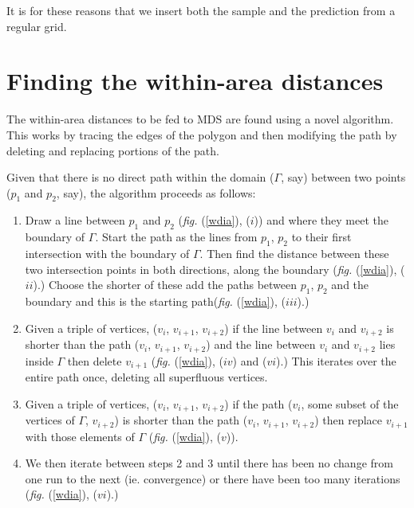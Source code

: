 \documentclass[a4paper,10pt]{article}
\newcommand{\fig}[1]{\emph{fig.} (\ref{#1})}
\begin{document}
It is for these reasons that we insert both the sample and the prediction from a regular grid.


\section{Finding the within-area distances}

The within-area distances to be fed to MDS are found using a novel algorithm. This works by tracing the edges of the polygon and then modifying the path by deleting and replacing portions of the path. 

Given that there is no direct path within the domain ($\Gamma$, say) between two points ($p_1$ and $p_2$, say), the algorithm proceeds as follows:

\begin{enumerate}
\item Draw a line between $p_1$ and $p_2$ (\fig{wdia}, ($i$)) and where they meet the boundary of $\Gamma$. Start the path as the lines from $p_1$, $p_2$ to their first intersection with the boundary of $\Gamma$. Then find the distance between these two intersection points in both directions, along the boundary (\fig{wdia}, ($ii$).) Choose the shorter of these add the paths between $p_1$, $p_2$ and the boundary and this is the starting path(\fig{wdia}, ($iii$).) 
\item Given a triple of vertices, ($v_i$, $v_{i+1}$, $v_{i+2}$) if the line between $v_i$ and $v_{i+2}$ is shorter than the path ($v_i$, $v_{i+1}$, $v_{i+2}$) and the line between $v_i$ and $v_{i+2}$ lies inside $\Gamma$ then delete $v_{i+1}$ (\fig{wdia}, ($iv$) and ($vi$).) This iterates over the entire path once, deleting all superfluous vertices. 
\item Given a triple of vertices, ($v_i$, $v_{i+1}$, $v_{i+2}$) if the path ($v_i$, some subset of the vertices of $\Gamma$, $v_{i+2}$) is shorter than the path ($v_i$, $v_{i+1}$, $v_{i+2}$) then replace $v_{i+1}$ with those elements of $\Gamma$ (\fig{wdia}, ($v$)). 
\item We then iterate between steps 2 and 3 until there has been no change from one run to the next (ie. convergence) or there have been too many iterations (\fig{wdia}, ($vi$).)
\end{enumerate}
\end{document}
